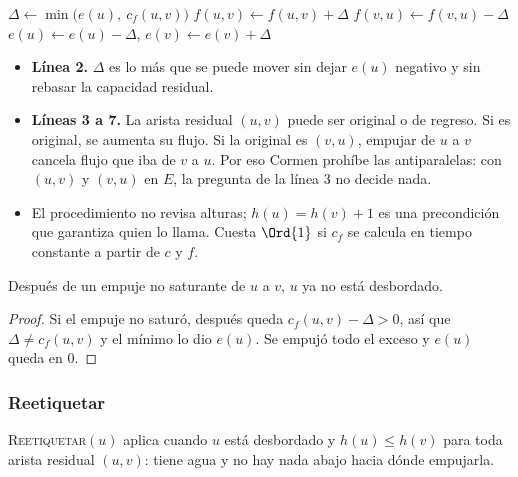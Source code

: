 \documentclass[11pt,letterpaper]{article}
\begin{document}
\begin{algorithm}[H]
\caption{\textsc{Empujar}$(u, v)$ \ (\textsc{Push} en Cormen)}
\label{alg:empujar}
\begin{algorithmic}[1]
  \State $\Delta \gets \min\bigl(e(u),\ c_f(u, v)\bigr)$
    \State $f(u, v) \gets f(u, v) + \Delta$ 
  \Else
    \State $f(v, u) \gets f(v, u) - \Delta$ 
  \EndIf
  \State $e(u) \gets e(u) - \Delta$, \quad $e(v) \gets e(v) + \Delta$
\EndProcedure
\end{algorithmic}
\end{algorithm}

\begin{itemize}
  \item \textbf{Línea 2.} $\Delta$ es lo más que se puede mover sin
        dejar $e(u)$ negativo y sin rebasar la capacidad residual.
  \item \textbf{Líneas 3 a 7.} La arista residual $(u, v)$ puede ser
        original o de regreso. Si es original, se aumenta su flujo. Si
        la original es $(v, u)$, empujar de $u$ a $v$ cancela flujo que
        iba de $v$ a $u$. Por eso Cormen prohíbe las antiparalelas: con
        $(u, v)$ y $(v, u)$ en $E$, la pregunta de la línea 3 no decide
        nada.
  \item El procedimiento no revisa alturas; $h(u) = h(v) + 1$ es una
        precondición que garantiza quien lo llama. Cuesta $\Ord{1}$ si
        $c_f$ se calcula en tiempo constante a partir de $c$ y $f$.
\end{itemize}

\begin{lema}
  \label{lem:push-no-saturante}
  Después de un empuje no saturante de $u$ a $v$, $u$ ya no está
  desbordado.
\end{lema}

\begin{proof}
  Si el empuje no saturó, después queda $c_f(u, v) - \Delta > 0$, así
  que $\Delta \neq c_f(u, v)$ y el mínimo lo dio $e(u)$. Se empujó
  todo el exceso y $e(u)$ queda en $0$.
\end{proof}

\subsubsection*{Reetiquetar}

\textsc{Reetiquetar}$(u)$ aplica cuando $u$ está desbordado y
$h(u) \le h(v)$ para toda arista residual $(u, v)$: tiene agua y no
hay nada abajo hacia dónde empujarla.
\end{document}
